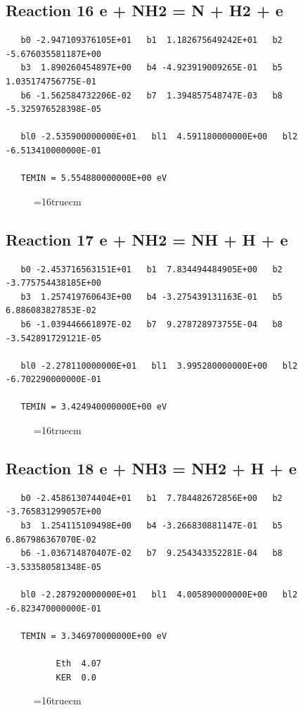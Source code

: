 \documentclass[12pt,dvipdfm]{article}
\begin{document}
\subsection{
Reaction 16 e + NH2 = N + H2 + e }
\begin{small}\begin{verbatim}
   b0 -2.947109376105E+01   b1  1.182675649242E+01   b2 -5.676035581187E+00
   b3  1.890260454897E+00   b4 -4.923919009265E-01   b5  1.035174756775E-01
   b6 -1.562584732206E-02   b7  1.394857548747E-03   b8 -5.325976528398E-05

   bl0 -2.535900000000E+01   bl1  4.591180000000E+00   bl2 -6.513410000000E-01

   TEMIN = 5.554880000000E+00 eV
\end{verbatim}\end{small}
\begin{figure}[h!] \label{n2rates}
\epsfxsize=16truecm
\end{figure}
\newpage

\subsection{
Reaction 17 e + NH2 = NH + H + e }
\begin{small}\begin{verbatim}
   b0 -2.453716563151E+01   b1  7.834494484905E+00   b2 -3.775754438185E+00
   b3  1.257419760643E+00   b4 -3.275439131163E-01   b5  6.886083827853E-02
   b6 -1.039446661897E-02   b7  9.278728973755E-04   b8 -3.542891729121E-05

   bl0 -2.278110000000E+01   bl1  3.995280000000E+00   bl2 -6.702290000000E-01

   TEMIN = 3.424940000000E+00 eV
\end{verbatim}\end{small}
\begin{figure}[h!] \label{n2rates}
\epsfxsize=16truecm
\end{figure}
\newpage

\subsection{
Reaction 18 e + NH3 = NH2 + H + e }
\begin{small}\begin{verbatim}
   b0 -2.458613074404E+01   b1  7.784482672856E+00   b2 -3.765831299057E+00
   b3  1.254115109498E+00   b4 -3.266830881147E-01   b5  6.867986367070E-02
   b6 -1.036714870407E-02   b7  9.254343352281E-04   b8 -3.533580581348E-05

   bl0 -2.287920000000E+01   bl1  4.005890000000E+00   bl2 -6.823470000000E-01

   TEMIN = 3.346970000000E+00 eV

          Eth  4.07
          KER  0.0
\end{verbatim}\end{small}
\begin{figure}[h!] \label{n2rates}
\epsfxsize=16truecm
\end{figure}
\newpage
\end{document}
